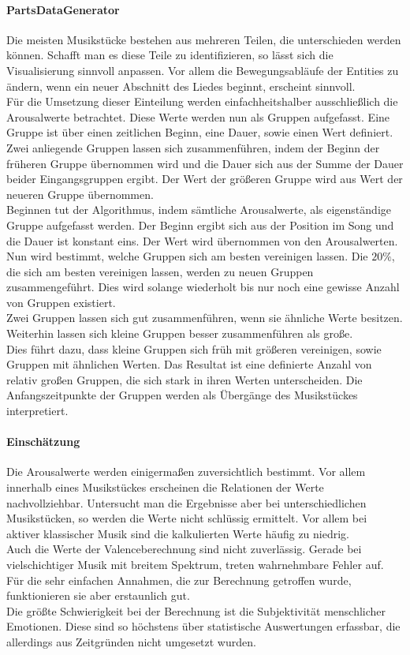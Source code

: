 \documentclass[11pt,a4paper]{article}
\begin{document}
\paragraph{PartsDataGenerator}
Die meisten Musikstücke bestehen aus mehreren Teilen, die unterschieden werden können. Schafft man es diese Teile zu identifizieren, so lässt sich die Visualisierung sinnvoll anpassen. Vor allem die Bewegungsabläufe der Entities zu ändern, wenn ein neuer Abschnitt des Liedes beginnt, erscheint sinnvoll.\\
Für die Umsetzung dieser Einteilung werden einfachheitshalber ausschließlich die Arousalwerte betrachtet. Diese Werte werden nun als Gruppen aufgefasst. Eine Gruppe ist über einen zeitlichen Beginn, eine Dauer, sowie einen Wert definiert. Zwei anliegende Gruppen lassen sich zusammenführen, indem der Beginn der früheren Gruppe übernommen wird und die Dauer sich aus der Summe der Dauer beider Eingangsgruppen ergibt. Der Wert der größeren Gruppe wird aus Wert der neueren Gruppe übernommen.\\
Beginnen tut der Algorithmus, indem sämtliche Arousalwerte, als eigenständige Gruppe aufgefasst werden. Der Beginn ergibt sich aus der Position im Song und die Dauer ist konstant eins. Der Wert wird übernommen von den Arousalwerten. Nun wird bestimmt, welche Gruppen sich am besten vereinigen lassen. Die $20\%$, die sich am besten vereinigen lassen, werden zu neuen Gruppen zusammengeführt. Dies wird solange wiederholt bis nur noch eine gewisse Anzahl von Gruppen existiert.\\
Zwei Gruppen lassen sich gut zusammenführen, wenn sie ähnliche Werte besitzen. Weiterhin lassen sich kleine Gruppen besser zusammenführen als große.\\
Dies führt dazu, dass kleine Gruppen sich früh mit größeren vereinigen, sowie Gruppen mit ähnlichen Werten. Das Resultat ist eine definierte Anzahl von relativ großen Gruppen, die sich stark in ihren Werten unterscheiden. Die Anfangszeitpunkte der Gruppen werden als Übergänge des Musikstückes interpretiert.

\paragraph{Einschätzung}
Die Arousalwerte werden einigermaßen zuversichtlich bestimmt. Vor allem innerhalb eines Musikstückes erscheinen die Relationen der Werte nachvollziehbar. Untersucht man die Ergebnisse aber bei unterschiedlichen Musikstücken, so werden die Werte nicht schlüssig ermittelt. Vor allem bei aktiver klassischer Musik sind die kalkulierten Werte häufig zu niedrig.\\
Auch die Werte der Valenceberechnung sind nicht zuverlässig. Gerade bei vielschichtiger Musik mit breitem Spektrum, treten wahrnehmbare Fehler auf. Für die sehr einfachen Annahmen, die zur Berechnung getroffen wurde, funktionieren sie aber erstaunlich gut.\\
Die größte Schwierigkeit bei der Berechnung ist die Subjektivität menschlicher Emotionen. Diese sind so höchstens über statistische Auswertungen erfassbar, die allerdings aus Zeitgründen nicht umgesetzt wurden.
\end{document}
